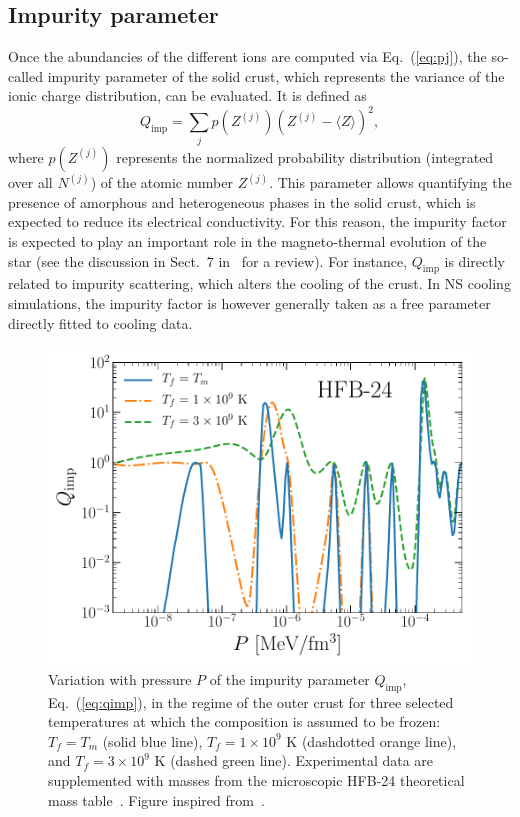 \subsection{Impurity parameter}\label{subsec:qimp_ocrust}

Once the abundancies of the different ions are computed via Eq.~(\ref{eq:pj}), 
the so-called impurity parameter of the solid crust, which represents the 
variance of the ionic charge distribution, can be evaluated. It is defined
as~\cite{Meisel2018}
%
\begin{equation}
  Q_{\text{imp}} = \sum_j p(Z^{(j)})(Z^{(j)}-\langle Z
  \rangle)^2,\label{eq:qimp}
\end{equation}
%
where $p(Z^{(j)})$ represents the normalized probability distribution 
(integrated over all $N^{(j)}$) of the atomic number $Z^{(j)}$.
This parameter allows quantifying the presence of amorphous and
heterogeneous phases in the solid crust, which is expected to reduce its 
electrical conductivity. For this reason, the impurity factor is 
expected to play an important role in the magneto-thermal evolution of the star 
(see the discussion in Sect.~7 in~\cite{Meisel2018} for a review). For 
instance, $Q_{\text{imp}}$ is directly related to impurity scattering, which 
alters the cooling of the crust.
In NS cooling simulations, the impurity factor is however generally taken as 
a free parameter directly fitted to cooling data.

\begin{figure}[!t]
  \begin{center}
    \includegraphics[width=0.9\linewidth]{figures/qimp_ocrust.pdf}
  \end{center}
  \caption[Impurity parameter versus pressure in the outer-crust regime]{
    Variation with pressure $P$ of the impurity parameter $Q_{\text{imp}}$,
    Eq.~(\ref{eq:qimp}), in the regime of the outer crust for three selected
    temperatures at which the composition is assumed to be frozen: 
    $T_f=T_m$ (solid blue line),
    $T_f=1\times 10^9$ \si{\kelvin} (dashdotted orange line), and 
    $T_f=3\times 10^9$ \si{\kelvin} (dashed green line).
    Experimental data are supplemented with masses from the microscopic 
    HFB-24 theoretical mass table~\cite{Goriely2013}. 
  Figure inspired from~\cite{Fantina2020}.}\label{fig:qimp_ocrust}
\end{figure}


